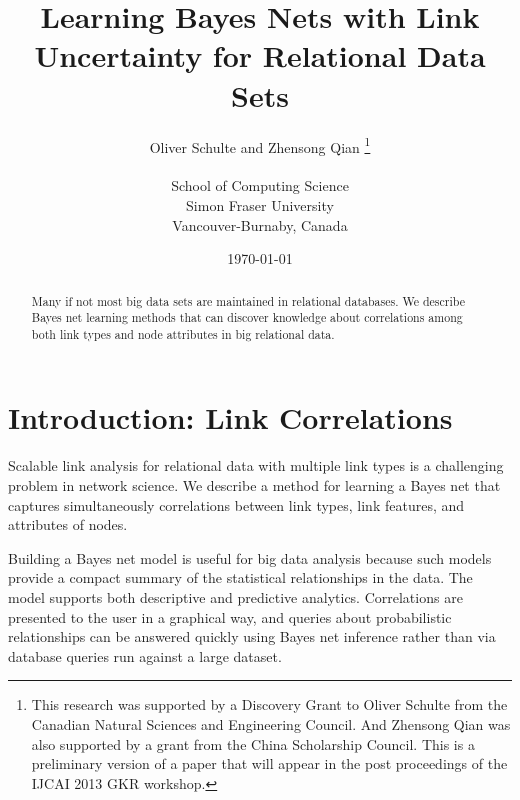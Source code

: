 \documentclass{article}
\begin{document}
\title{Learning Bayes Nets with Link Uncertainty for Relational Data Sets}
\author{Oliver Schulte and Zhensong Qian
\thanks{
This research was supported by a Discovery Grant to Oliver Schulte from the Canadian Natural Sciences and Engineering Council. 
And Zhensong Qian was also supported by a grant from the China Scholarship Council.
This is a preliminary version of a paper that will appear in the post proceedings of the IJCAI 2013 GKR workshop.
}\\
\\ School of Computing Science\\ Simon Fraser University\\Vancouver-Burnaby, Canada
}
\date{\today}

\maketitle

\begin{abstract} Many if not most big data sets are maintained in relational databases. We describe Bayes net learning methods that can discover knowledge about correlations among both link types and node attributes in big relational data. 
\end{abstract}


\section{Introduction: Link Correlations} Scalable link analysis for relational data with multiple link types is a challenging problem in network science. We describe a method for learning a Bayes net that captures simultaneously correlations between link types, link features, and attributes of nodes. 

Building a Bayes net model is useful for big data analysis because such models provide a compact summary of the statistical relationships in the data. The model supports both descriptive and predictive analytics. Correlations are presented to the user in a graphical way, and queries about probabilistic relationships can be answered quickly using Bayes net inference rather than via database queries run against a large dataset. 
\end{document}

